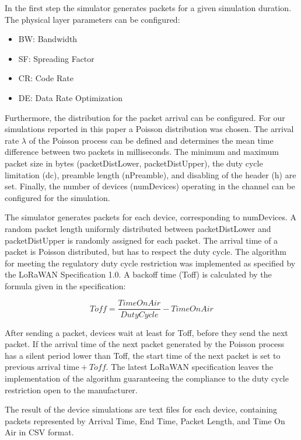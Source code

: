 \documentclass{article}
\begin{document}
In the first step the simulator generates packets for a given simulation
duration. The physical layer parameters can be configured:

\begin{itemize}
    \item BW: Bandwidth
    \item SF: Spreading Factor
    \item CR: Code Rate
    \item DE: Data Rate Optimization
\end{itemize}
\vspace*{\baselineskip}

Furthermore, the distribution for the packet arrival can be configured. For our
simulations reported in this paper a Poisson distribution was chosen. The
arrival rate $\lambda$ of the Poisson process can be defined and determines the
mean time difference between two packets in milliseconds. The minimum and
maximum packet size in bytes (packetDistLower, packetDistUpper), the duty cycle
limitation (dc), preamble length (nPreamble), and disabling of the header (h)
are set. Finally, the number of devices (numDevices) operating in the channel
can be configured for the simulation. 

The simulator generates packets for each device, corresponding to numDevices. A
random packet length uniformly distributed between packetDistLower and
packetDistUpper is randomly assigned for each packet. The arrival time of a
packet is Poisson distributed, but has to respect the duty cycle. The algorithm
for meeting the regulatory duty cycle restriction was implemented as specified
by the LoRaWAN Specification 1.0. A backoff time (Toff) is calculated by the
formula given in the specification:

$$ Toff = \frac{TimeOnAir}{DutyCycle} - TimeOnAir$$

After sending a packet, devices wait at least for Toff, before they send the
next packet. If the arrival time of the next packet generated by the Poisson
process has a silent period lower than Toff, the start time of the next packet
is set to $\textrm{previous arrival time} + Toff$. The latest LoRaWAN
specification leaves the implementation of the algorithm guaranteeing the
compliance to the duty cycle restriction open to the manufacturer.

The result of the device simulations are text files for each device, containing
packets represented by Arrival Time, End Time, Packet Length, and Time On Air
in CSV format.
\end{document}
